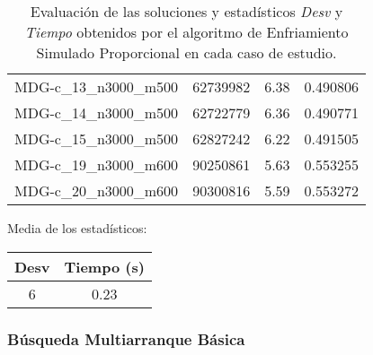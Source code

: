 \documentclass{article}
\begin{document}
\begin{table}[H]
\begin{tabular}{|cccc|}
		MDG-c\_13\_n3000\_m500 & 62739982 & 6.38 & 0.490806\\
		MDG-c\_14\_n3000\_m500 & 62722779 & 6.36 & 0.490771\\
		MDG-c\_15\_n3000\_m500 & 62827242 & 6.22 & 0.491505\\
		MDG-c\_19\_n3000\_m600 & 90250861 & 5.63 & 0.553255\\
		MDG-c\_20\_n3000\_m600 & 90300816 & 5.59 & 0.553272\\
		\hline
	\end{tabular}
	\caption{Evaluación de las soluciones y estadísticos \emph{Desv} y \emph{Tiempo} obtenidos por el algoritmo de Enfriamiento Simulado Proporcional en cada caso de estudio.}
	\label{tab:es-proporcional}
\end{table}

Media de los estadísticos:
\begin{table}[H]
	\centering
	\begin{tabular}{|cc|}
		\hline
		Desv & Tiempo (s)\\ \hline
		6 & 0.23 \\
		\hline
	\end{tabular}
\end{table}

\pagebreak

\subsubsection*{Búsqueda Multiarranque Básica}
\end{document}
